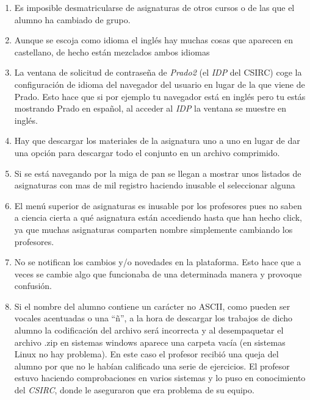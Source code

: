 \begin{enumerate}

\item Es imposible desmatricularse de asignaturas de otros cursos o de las que el alumno ha cambiado de grupo.

\item Aunque se escoja como idioma el inglés hay muchas cosas que aparecen en castellano, de hecho están mezclados ambos idiomas

\item La ventana de solicitud de contraseña de \textit{Prado2} (el \textit{IDP} del CSIRC) coge la configuración de idioma del navegador del usuario en lugar de la que viene de Prado. Esto hace que si por ejemplo tu navegador está en inglés pero tu estás mostrando Prado en español, al acceder al \textit{IDP} la ventana se muestre en inglés.

\item Hay que descargar los materiales de la asignatura uno a uno en lugar de dar una opción para descargar todo el conjunto en un archivo comprimido.

\item Si se está navegando por la miga de pan se llegan a mostrar unos listados de asignaturas con mas de mil registro haciendo inusable el seleccionar alguna

\item El menú superior de asignaturas es inusable por los profesores pues no saben a ciencia cierta a qué asignatura están accediendo hasta que han hecho click, ya que muchas asignaturas comparten nombre simplemente cambiando los profesores.

\item No se notifican los cambios y/o novedades en la plataforma. Esto hace que a veces se cambie algo que funcionaba de una determinada manera y provoque confusión.

\item Si el nombre del alumno contiene un carácter no ASCII, como pueden ser vocales acentuadas o una ``ñ'', a la hora de descargar los trabajos de dicho alumno la codificación del archivo será incorrecta y al desempaquetar el archivo .zip en sistemas windows aparece una carpeta vacía (en sistemas Linux no hay problema). En este caso el profesor recibió una queja del alumno por que no le habían calificado una serie de ejercicios. El profesor estuvo haciendo comprobaciones en varios sistemas y lo puso en conocimiento del \textit{CSIRC}, donde le aseguraron que era problema de su equipo.


\end{enumerate}
